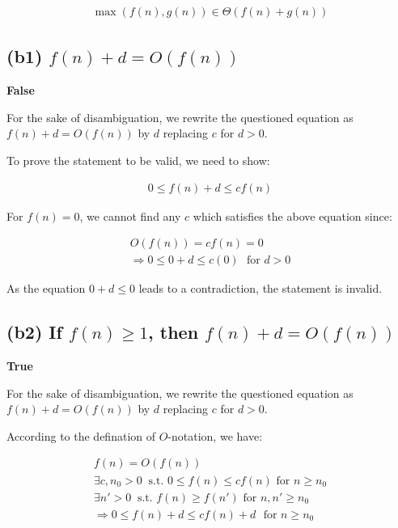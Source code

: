 \documentclass[12pt]{article}
\begin{document}
\begin{gather}
    \max(f(n), g(n)) \in \Theta (f(n) + g(n))
\end{gather}


\subsection{(b1) $f(n) + d = O(f(n))$}

\textbf{False}

For the sake of disambiguation, we rewrite the questioned equation as $f(n) + d = O(f(n))$ by $d$ replacing $c$ for $d > 0$.

To prove the statement to be valid, we need to show:

\begin{gather}
    0 \leq f(n) + d \leq cf(n)
\end{gather}


For $f(n) = 0$, we cannot find any $c$ which satisfies the above equation since:

\begin{gather}
    O(f(n)) = cf(n) = 0  \nonumber \\
    \Rightarrow 0 \leq 0 + d \leq c(0) \ \ \ \text{for $d > 0$}
\end{gather}

As the equation $0 + d \leq 0$ leads to a contradiction, the statement is invalid.


\subsection{(b2) If $f(n) \geq 1$, then $f(n) + d = O(f(n))$}
\textbf{True}

For the sake of disambiguation, we rewrite the questioned equation as $f(n) + d = O(f(n))$ by $d$ replacing $c$ for $d > 0$.


According to the defination of $O$-notation, we have:

\begin{gather}
 f(n) = O(f(n)) \nonumber\\
 \exists c, n_{0} > 0 \ \text{ s.t.  $0 \leq f(n) \leq cf(n)$ \ \ \ for $n \geq n_{0}$} \\
 \exists n' > 0 \ \text{ s.t.  $f(n) \geq f(n')$ \ \ \ for $n, n' \geq n_{0}$} \\
 \Rightarrow 0 \leq f(n)+d \leq cf(n) + d \ \ \ \text{for $n \geq n_{0}$}
\end{gather}
\end{document}
